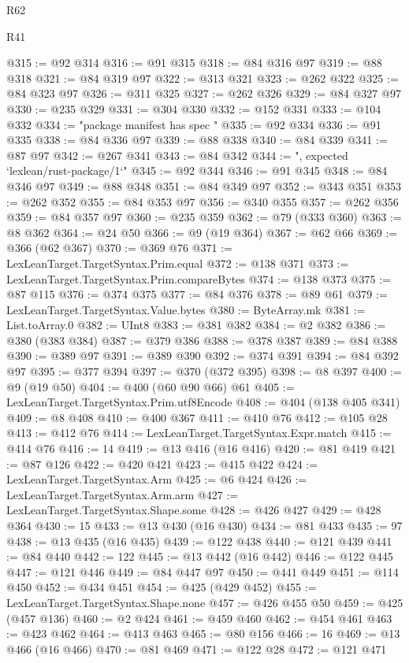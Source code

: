 \begin{lexlean}{R62}
\begin{lexlean}{R41}
\begin{coremodule}
{{{{{{{{{{{{{{{{{{{{{{{{{{{{{{{{{{{{{{{{{{{{{{{{{{{{{{{{{{{{{{{{{{{{{{{{{{{{{{{{{{{{{{{@315 := @92 @314
@316 := @91 @315
@318 := @84 @316 @97
@319 := @88 @318
@321 := @84 @319 @97
@322 := @313 @321
@323 := @262 @322
@325 := @84 @323 @97
@326 := @311 @325
@327 := @262 @326
@329 := @84 @327 @97
@330 := @235 @329
@331 := @304 @330
@332 := @152 @331
@333 := @104 @332
@334 := "package manifest has spec "
@335 := @92 @334
@336 := @91 @335
@338 := @84 @336 @97
@339 := @88 @338
@340 := @84 @339
@341 := @87 @97
@342 := @267 @341
@343 := @84 @342
@344 := ", expected `lexlean/rust-package/1`"
@345 := @92 @344
@346 := @91 @345
@348 := @84 @346 @97
@349 := @88 @348
@351 := @84 @349 @97
@352 := @343 @351
@353 := @262 @352
@355 := @84 @353 @97
@356 := @340 @355
@357 := @262 @356
@359 := @84 @357 @97
@360 := @235 @359
@362 := @79 (@333 @360)
@363 := @8 @362
@364 := @24 @50
@366 := @9 (@19 @364)
@367 := @62 @66
@369 := @366 (@62 @367)
@370 := @369 @76
@371 := LexLeanTarget.TargetSyntax.Prim.equal
@372 := @138 @371
@373 := LexLeanTarget.TargetSyntax.Prim.compareBytes
@374 := @138 @373
@375 := @87 @115
@376 := @374 @375
@377 := @84 @376
@378 := @89 @61
@379 := LexLeanTarget.TargetSyntax.Value.bytes
@380 := ByteArray.mk
@381 := List.toArray.{0}
@382 := UInt8
@383 := @381 @382
@384 := @2 @382
@386 := @380 (@383 @384)
@387 := @379 @386
@388 := @378 @387
@389 := @84 @388
@390 := @389 @97
@391 := @389 @390
@392 := @374 @391
@394 := @84 @392 @97
@395 := @377 @394
@397 := @370 (@372 @395)
@398 := @8 @397
@400 := @9 (@19 @50)
@404 := @400 (@60 @90 @66) @61
@405 := LexLeanTarget.TargetSyntax.Prim.utf8Encode
@408 := @404 (@138 @405 @341)
@409 := @8 @408
@410 := @400 @367
@411 := @410 @76
@412 := @105 @28
@413 := @412 @76
@414 := LexLeanTarget.TargetSyntax.Expr.match
@415 := @414 @76
@416 := 14
@419 := @13 @416 (@16 @416)
@420 := @81 @419
@421 := @87 @126
@422 := @420 @421
@423 := @415 @422
@424 := LexLeanTarget.TargetSyntax.Arm
@425 := @6 @424
@426 := LexLeanTarget.TargetSyntax.Arm.arm
@427 := LexLeanTarget.TargetSyntax.Shape.some
@428 := @426 @427
@429 := @428 @364
@430 := 15
@433 := @13 @430 (@16 @430)
@434 := @81 @433
@435 := 97
@438 := @13 @435 (@16 @435)
@439 := @122 @438
@440 := @121 @439
@441 := @84 @440
@442 := 122
@445 := @13 @442 (@16 @442)
@446 := @122 @445
@447 := @121 @446
@449 := @84 @447 @97
@450 := @441 @449
@451 := @114 @450
@452 := @434 @451
@454 := @425 (@429 @452)
@455 := LexLeanTarget.TargetSyntax.Shape.none
@457 := @426 @455 @50
@459 := @425 (@457 @136)
@460 := @2 @424
@461 := @459 @460
@462 := @454 @461
@463 := @423 @462
@464 := @413 @463
@465 := @80 @156
@466 := 16
@469 := @13 @466 (@16 @466)
@470 := @81 @469
@471 := @122 @28
@472 := @121 @471
}}}}}}}}}}}}}}}}}}}}}}}}}}}}}}}}}}}}}}}}}}}}}}}}}}}}}}}}}}}}}}}}}}}}}}}}}}}}}}}}}}}}}}}
\end{coremodule}
\end{lexlean}
\end{lexlean}
